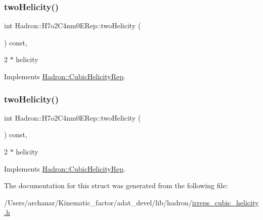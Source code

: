 \subsubsection{\texorpdfstring{twoHelicity()}{twoHelicity()}\hspace{0.1cm}{\footnotesize\ttfamily [1/2]}}
{\footnotesize\ttfamily int Hadron\+::\+H7o2\+C4nm0\+E\+Rep\+::two\+Helicity (\begin{DoxyParamCaption}{ }\end{DoxyParamCaption}) const\hspace{0.3cm}{\ttfamily [inline]}, {\ttfamily [virtual]}}

2 $\ast$ helicity 

Implements \mbox{\hyperlink{structHadron_1_1CubicHelicityRep_af507aa56fc2747eacc8cb6c96db31ecc}{Hadron\+::\+Cubic\+Helicity\+Rep}}.

\mbox{\label{structHadron_1_1H7o2C4nm0ERep_aa823f506650bea0e0e2f79894f6f8360}} 
\subsubsection{\texorpdfstring{twoHelicity()}{twoHelicity()}\hspace{0.1cm}{\footnotesize\ttfamily [2/2]}}
{\footnotesize\ttfamily int Hadron\+::\+H7o2\+C4nm0\+E\+Rep\+::two\+Helicity (\begin{DoxyParamCaption}{ }\end{DoxyParamCaption}) const\hspace{0.3cm}{\ttfamily [inline]}, {\ttfamily [virtual]}}

2 $\ast$ helicity 

Implements \mbox{\hyperlink{structHadron_1_1CubicHelicityRep_af507aa56fc2747eacc8cb6c96db31ecc}{Hadron\+::\+Cubic\+Helicity\+Rep}}.



The documentation for this struct was generated from the following file\+:\begin{DoxyCompactItemize}
\item 
/\+Users/archanar/\+Kinematic\+\_\+factor/adat\+\_\+devel/lib/hadron/\mbox{\hyperlink{lib_2hadron_2irreps__cubic__helicity_8h}{irreps\+\_\+cubic\+\_\+helicity.\+h}}\end{DoxyCompactItemize}
